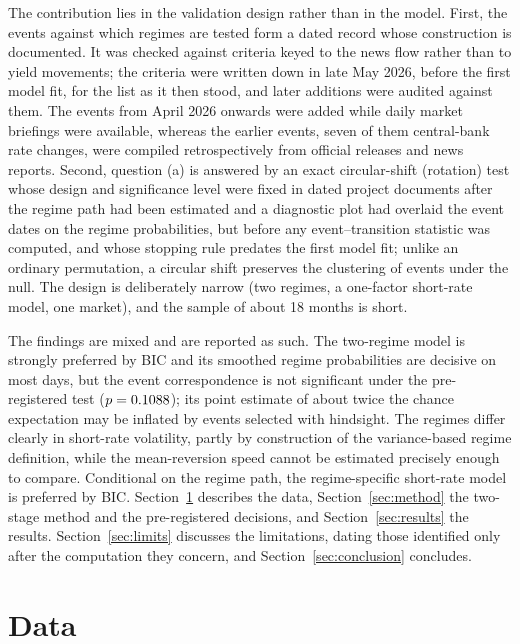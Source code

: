 \documentclass[11pt,a4paper]{article}
\begin{document}
The contribution lies in the validation design rather than in the model. First, the events against which regimes are tested form a dated record whose construction is documented. It was checked against criteria keyed to the news flow rather than to yield movements; the criteria were written down in late May 2026, before the first model fit, for the list as it then stood, and later additions were audited against them. The \NEventsLate{} events from April 2026 onwards were added while daily market briefings were available, whereas the \NEventsEarly{} earlier events, seven of them central-bank rate changes, were compiled retrospectively from official releases and news reports. Second, question (a) is answered by an exact circular-shift (rotation) test whose design and significance level were fixed in dated project documents after the regime path had been estimated and a diagnostic plot had overlaid the event dates on the regime probabilities, but before any event--transition statistic was computed, and whose stopping rule predates the first model fit; unlike an ordinary permutation, a circular shift preserves the clustering of events under the null. The design is deliberately narrow (two regimes, a one-factor short-rate model, one market), and the sample of about 18 months is short.

The findings are mixed and are reported as such. The two-regime model is strongly preferred by BIC and its smoothed regime probabilities are decisive on most days, but the event correspondence is not significant under the pre-registered test ($p=0.1088$); its point estimate of about twice the chance expectation may be inflated by events selected with hindsight. The regimes differ clearly in short-rate volatility, partly by construction of the variance-based regime definition, while the mean-reversion speed cannot be estimated precisely enough to compare. Conditional on the regime path, the regime-specific short-rate model is preferred by BIC. Section~\ref{sec:data} describes the data, Section~\ref{sec:method} the two-stage method and the pre-registered decisions, and Section~\ref{sec:results} the results. Section~\ref{sec:limits} discusses the limitations, dating those identified only after the computation they concern, and Section~\ref{sec:conclusion} concludes.

\section{Data}\label{sec:data}
\end{document}
